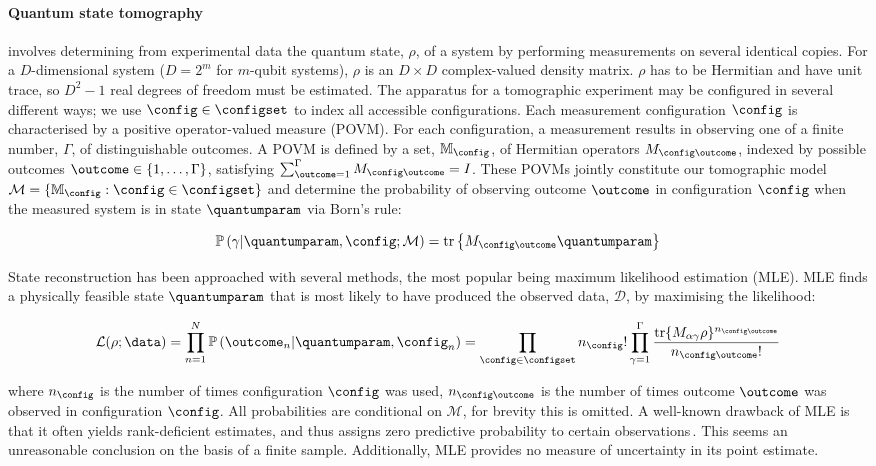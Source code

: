 \paragraph{Quantum state tomography} involves determining from experimental data the quantum state, $\rho$, of a system by performing measurements on several identical copies. For a $D$-dimensional system ($D=2^m$ for $m$-qubit systems), $\rho$ is an $D \times D$ complex-valued density matrix. $\rho$ has to be Hermitian and have unit trace, so $D^2-1$ real degrees of freedom must be estimated. The apparatus for a tomographic experiment may be configured in several different ways; we use $\config\in\configset$ to index all accessible configurations. Each measurement configuration $\config$ is characterised by a positive operator-valued measure (POVM). For each configuration, a measurement results in observing one of a finite number, $\Gamma$, of distinguishable outcomes. A POVM is defined by a set, $\mathbb{M}_{\config}$, of Hermitian operators $M_{\config\outcome}$, indexed by possible outcomes $\outcome\in\{1,\ldots,\Gamma\}$, satisfying $\sum_{\outcome=1}^{\Gamma} M_{\config\outcome} = I$. These POVMs jointly constitute our tomographic model $\mathcal{M}=\{\mathbb{M}_{\config}:\config\in\configset\}$ and determine the probability of observing outcome $\outcome$ in configuration $\config$ when the measured system is in state $\quantumparam$ via Born's rule:

\begin{equation}
\mathbb{P}\left(\gamma\vert\quantumparam,\config;\mathcal{M}\right) = \text{tr}\left\{M_{\config\outcome}\quantumparam \right\}\label{eqn:born}\notag
\end{equation}

State reconstruction has been approached with several methods, the most popular being maximum likelihood estimation (MLE). MLE finds a physically feasible state $\quantumparam$ that is most likely to have produced the observed data, $\mathcal{D}$, by maximising the likelihood:

\begin{equation}
\label{eqn:lik}
\mathcal{L}(\rho;\data)=\prod_{n=1}^{N} \mathbb{P}\left(\outcome_n\vert\quantumparam,\config_n\right) = \prod_{\config \in \configset}n_{\config}!\prod_{\gamma=1}^{\Gamma}\frac{\mbox{tr}\{M_{\alpha\gamma}\rho\}^{n_{\config\outcome}}}{n_{\config\outcome}!}
\end{equation}

where $n_{\config}$ is the number of times configuration $\config$ was used, $n_{\config\outcome}$ is the number of times outcome $\outcome$ was observed in configuration $\config$. All probabilities are conditional on $\mathcal{M}$, for brevity this is omitted. A well-known drawback of MLE is that it often yields rank-deficient estimates, and thus assigns zero predictive probability to certain observations\,\cite{BayesianTomography}. This seems an unreasonable conclusion on the basis of a finite sample.
Additionally, MLE provides no measure of uncertainty in its point estimate.

